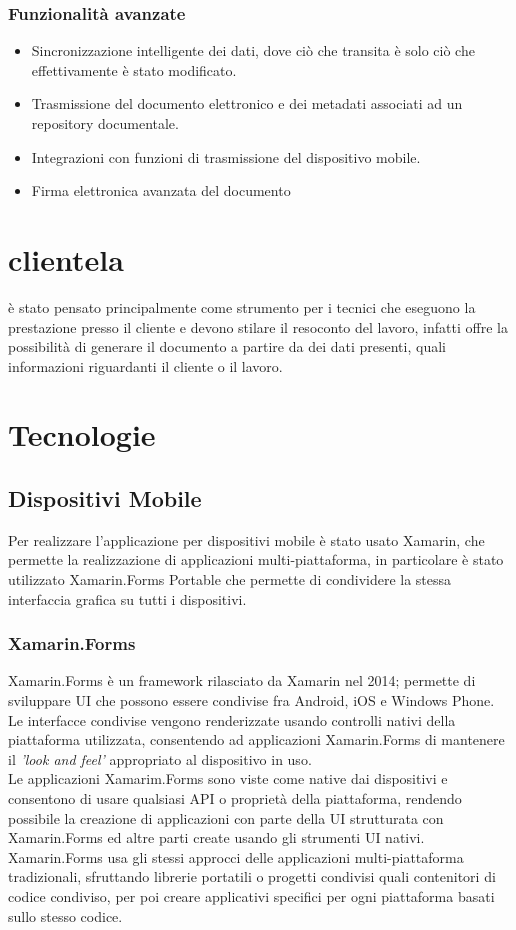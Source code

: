 \subsubsection{Funzionalità avanzate}
\begin{itemize}
	\item Sincronizzazione intelligente dei dati, dove ciò che transita è solo ciò che effettivamente è stato modificato.
	\item Trasmissione del documento elettronico e dei metadati associati ad un repository documentale.
	\item Integrazioni con funzioni di trasmissione del dispositivo mobile.
	\item Firma elettronica avanzata del documento
\end{itemize}

\section{clientela}
\app è stato pensato principalmente come strumento per i tecnici che eseguono la prestazione presso il cliente e devono stilare il resoconto del lavoro, infatti offre la possibilità di generare il documento a partire da dei dati presenti, quali informazioni riguardanti il cliente o il lavoro.

\section{Tecnologie}
\subsection{Dispositivi Mobile}
Per realizzare l'applicazione per dispositivi mobile è stato usato Xamarin, che permette la realizzazione di applicazioni multi-piattaforma, in particolare è stato utilizzato Xamarin.Forms Portable che permette di condividere la stessa interfaccia grafica su tutti i dispositivi.
\subsubsection{Xamarin.Forms}
Xamarin.Forms è un framework rilasciato da Xamarin nel 2014; permette di sviluppare UI che possono essere condivise fra Android, iOS e Windows Phone. Le interfacce condivise vengono renderizzate usando controlli nativi della piattaforma utilizzata, consentendo ad applicazioni Xamarin.Forms di mantenere il \textit{'look and feel'} appropriato al dispositivo in uso.
\\
Le applicazioni Xamarim.Forms sono viste come native dai dispositivi e consentono di usare qualsiasi API o proprietà della piattaforma, rendendo possibile la creazione di applicazioni con parte della UI strutturata con Xamarin.Forms ed altre parti create usando gli strumenti UI nativi.
\\
Xamarin.Forms usa gli stessi approcci delle applicazioni multi-piattaforma tradizionali, sfruttando librerie portatili o progetti condivisi quali contenitori di codice condiviso, per poi creare applicativi specifici per ogni piattaforma basati sullo stesso codice.
